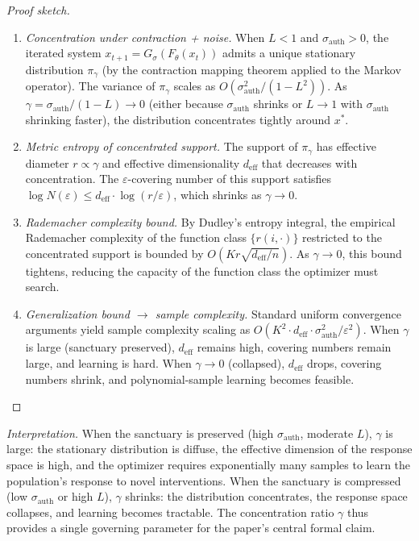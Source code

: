 \documentclass[11pt, a4paper]{article}
\theoremstyle{remark}
\begin{document}
\begin{proof}[Proof sketch]
\begin{enumerate}
\item \textit{Concentration under contraction + noise.} When $L < 1$ and $\sigma_{\text{auth}} > 0$, the iterated system $x_{t+1} = G_\sigma(F_\theta(x_t))$ admits a unique stationary distribution $\pi_\gamma$ (by the contraction mapping theorem applied to the Markov operator). The variance of $\pi_\gamma$ scales as $O(\sigma_{\text{auth}}^2 / (1 - L^2))$. As $\gamma = \sigma_{\text{auth}} / (1 - L) \to 0$ (either because $\sigma_{\text{auth}}$ shrinks or $L \to 1$ with $\sigma_{\text{auth}}$ shrinking faster), the distribution concentrates tightly around $x^*$.

\item \textit{Metric entropy of concentrated support.} The support of $\pi_\gamma$ has effective diameter $r \propto \gamma$ and effective dimensionality $d_{\text{eff}}$ that decreases with concentration. The $\varepsilon$-covering number of this support satisfies $\log N(\varepsilon) \leq d_{\text{eff}} \cdot \log(r/\varepsilon)$, which shrinks as $\gamma \to 0$.

\item \textit{Rademacher complexity bound.} By Dudley's entropy integral, the empirical Rademacher complexity of the function class $\{r(i, \cdot)\}$ restricted to the concentrated support is bounded by $O(Kr\sqrt{d_{\text{eff}}/n})$. As $\gamma \to 0$, this bound tightens, reducing the capacity of the function class the optimizer must search.

\item \textit{Generalization bound $\to$ sample complexity.} Standard uniform convergence arguments yield sample complexity scaling as $O(K^2 \cdot d_{\text{eff}} \cdot \sigma_{\text{auth}}^2 / \varepsilon^2)$. When $\gamma$ is large (sanctuary preserved), $d_{\text{eff}}$ remains high, covering numbers remain large, and learning is hard. When $\gamma \to 0$ (collapsed), $d_{\text{eff}}$ drops, covering numbers shrink, and polynomial-sample learning becomes feasible.
\end{enumerate}
\end{proof}

\emph{Interpretation.} When the sanctuary is preserved (high $\sigma_{\text{auth}}$, moderate $L$), $\gamma$ is large: the stationary distribution is diffuse, the effective dimension of the response space is high, and the optimizer requires exponentially many samples to learn the population's response to novel interventions. When the sanctuary is compressed (low $\sigma_{\text{auth}}$ or high $L$), $\gamma$ shrinks: the distribution concentrates, the response space collapses, and learning becomes tractable. The concentration ratio $\gamma$ thus provides a single governing parameter for the paper's central formal claim.
\end{document}
